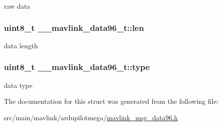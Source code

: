 raw data 

\hypertarget{struct____mavlink__data96__t_a2afda58f4d9420c31003cf3474e5c271}{
\subsubsection[{len}]{\setlength{\rightskip}{0pt plus 5cm}uint8\+\_\+t \+\_\+\+\_\+mavlink\+\_\+data96\+\_\+t\+::len}}\label{struct____mavlink__data96__t_a2afda58f4d9420c31003cf3474e5c271}


data length 

\hypertarget{struct____mavlink__data96__t_aad6f12d8b87e172531fa5f6827acc769}{
\subsubsection[{type}]{\setlength{\rightskip}{0pt plus 5cm}uint8\+\_\+t \+\_\+\+\_\+mavlink\+\_\+data96\+\_\+t\+::type}}\label{struct____mavlink__data96__t_aad6f12d8b87e172531fa5f6827acc769}


data type 



The documentation for this struct was generated from the following file\+:\begin{DoxyCompactItemize}
\item 
src/main/mavlink/ardupilotmega/\hyperlink{mavlink__msg__data96_8h}{mavlink\+\_\+msg\+\_\+data96.\+h}\end{DoxyCompactItemize}
